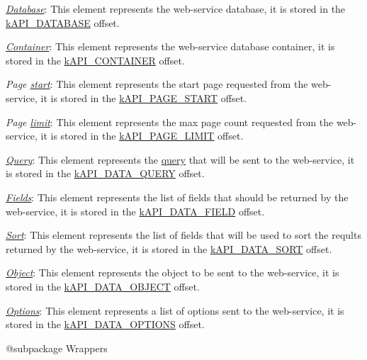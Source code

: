 \begin{DoxyItemize}
\item {\itshape \hyperlink{}{Database}}\-: This element represents the web-\/service database, it is stored in the \hyperlink{}{k\-A\-P\-I\-\_\-\-D\-A\-T\-A\-B\-A\-S\-E} offset. 
\item {\itshape \hyperlink{}{Container}}\-: This element represents the web-\/service database container, it is stored in the \hyperlink{}{k\-A\-P\-I\-\_\-\-C\-O\-N\-T\-A\-I\-N\-E\-R} offset. 
\item {\itshape Page \hyperlink{}{start}}\-: This element represents the start page requested from the web-\/service, it is stored in the \hyperlink{}{k\-A\-P\-I\-\_\-\-P\-A\-G\-E\-\_\-\-S\-T\-A\-R\-T} offset. 
\item {\itshape Page \hyperlink{}{limit}}\-: This element represents the max page count requested from the web-\/service, it is stored in the \hyperlink{}{k\-A\-P\-I\-\_\-\-P\-A\-G\-E\-\_\-\-L\-I\-M\-I\-T} offset. 
\item {\itshape \hyperlink{}{Query}}\-: This element represents the \hyperlink{class_c_query}{query} that will be sent to the web-\/service, it is stored in the \hyperlink{}{k\-A\-P\-I\-\_\-\-D\-A\-T\-A\-\_\-\-Q\-U\-E\-R\-Y} offset. 
\item {\itshape \hyperlink{}{Fields}}\-: This element represents the list of fields that should be returned by the web-\/service, it is stored in the \hyperlink{}{k\-A\-P\-I\-\_\-\-D\-A\-T\-A\-\_\-\-F\-I\-E\-L\-D} offset. 
\item {\itshape \hyperlink{}{Sort}}\-: This element represents the list of fields that will be used to sort the reqults returned by the web-\/service, it is stored in the \hyperlink{}{k\-A\-P\-I\-\_\-\-D\-A\-T\-A\-\_\-\-S\-O\-R\-T} offset. 
\item {\itshape \hyperlink{}{Object}}\-: This element represents the object to be sent to the web-\/service, it is stored in the \hyperlink{}{k\-A\-P\-I\-\_\-\-D\-A\-T\-A\-\_\-\-O\-B\-J\-E\-C\-T} offset. 
\item {\itshape \hyperlink{}{Options}}\-: This element represents a list of options sent to the web-\/service, it is stored in the \hyperlink{}{k\-A\-P\-I\-\_\-\-D\-A\-T\-A\-\_\-\-O\-P\-T\-I\-O\-N\-S} offset. 
\end{DoxyItemize}

\begin{DoxyVerb}    @subpackage     Wrappers\end{DoxyVerb}


